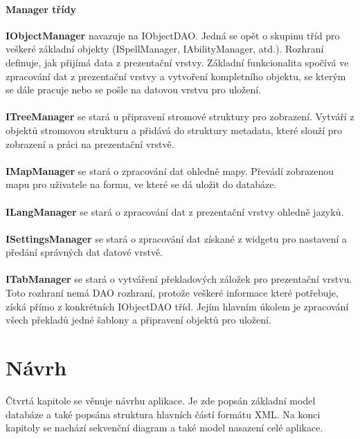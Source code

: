 \documentclass[thesis=B,czech]{resources/FITthesis}[2012/06/26]
\begin{document}
\subsubsection*{Manager třídy}
\textbf{IObjectManager} navazuje na IObjectDAO. Jedná se opět o skupinu tříd pro veškeré základní objekty (ISpellManager, IAbilityManager, atd.). Rozhraní definuje, jak přijímá data z prezentační vrstvy. Základní funkcionalita spočívá ve zpracování dat z prezentační vrstvy a vytvoření kompletního objektu, se kterým se dále pracuje nebo se pošle na datovou vrstvu pro uložení.\\
\\
\noindent\textbf{ITreeManager} se stará u připravení stromové struktury pro zobrazení. Vytváří z objektů stromovou strukturu a přidává do struktury metadata, které slouží pro zobrazení a práci na prezentační vrstvě.\\
\\
\textbf{IMapManager} se stará o zpracování dat ohledně mapy. Převádí zobrazenou mapu pro uživatele na formu, ve které se dá uložit do databáze. \\
\\
\textbf{ILangManager} se stará o zpracování dat z prezentační vrstvy ohledně jazyků.\\
\\
\textbf{ISettingsManager} se stará o zpracování dat získané z widgetu pro nastavení a předání správných dat datové vrstvě.\\
\\
\textbf{ITabManager} se stará o vytváření překladových záložek pro prezentační vrstvu. Toto rozhraní nemá DAO rozhraní, protože veškeré informace které potřebuje, získá přímo z konkrétních IObjectDAO tříd. Jejím hlavním úkolem je zpracování všech překladů jedné šablony a připravení objektů pro uložení.\\





\chapter{Návrh}
Čtvrtá kapitole se věnuje návrhu aplikace. Je zde popsán základní model databáze a také popsána struktura hlavních částí formátu XML. Na konci kapitoly se nachází sekvenční diagram a také model nasazení celé aplikace. 
\end{document}
